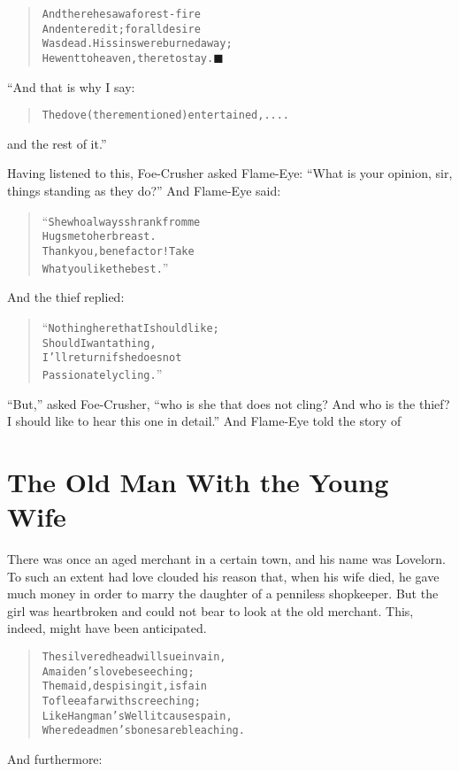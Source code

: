 \documentclass[article, twoside, 14pt]{memoir}
\newcommand{\qed}{\hfill \ensuremath{\blacksquare}}
\renewenvironment{verbatim}{%
\begin{quote}%
\vskip -10pt%
\begin{alltt}\normalfont\large}{\end{alltt}%
\end{quote}%
\vskip -10pt
} %
\begin{document}
\begin{verbatim}
And there he saw a forest-fire
And entered it; for all desire
Was dead. His sins were burned away;
He went to heaven, there to stay.\hyperref[s55]{\qed}
\end{verbatim}
“And that is why I say:

\begin{verbatim}
The dove (there mentioned) entertained, ....
\end{verbatim}
and the rest of it.”

Having listened to this, Foe-Crusher asked Flame-Eye:
``What is your opinion, sir, things standing as they do?'' And
Flame-Eye said:

\begin{verbatim}
“She who always shrank from me
Hugs me to her breast.
Thank you, benefactor! Take
What you like the best.”
\end{verbatim}
And the thief replied:

\begin{verbatim}
“Nothing here that I should like;
Should I want a thing,
I'll return if she does not
Passionately cling.”
\end{verbatim}
``But,'' asked Foe-Crusher,
``who is she that does not cling? And who is the thief? I should like to hear this one in detail.''
And Flame-Eye told the story of

\chapter{The Old Man With the Young Wife}

\label{s56}

There was once an aged merchant in a certain town, and his name was
Lovelorn. To such an extent had love clouded his reason that, when
his wife died, he gave much money in order to marry the daughter of
a penniless shopkeeper. But the girl was heartbroken and could not
bear to look at the old merchant. This, indeed, might have been
anticipated.

\begin{verbatim}
The silvered head will sue in vain,
    A maiden's love beseeching;
The maid, despising it, is fain
    To flee afar with screeching;
Like Hangman's Well it causes pain,
    Where dead men's bones are bleaching.
\end{verbatim}
And furthermore:
\end{document}

